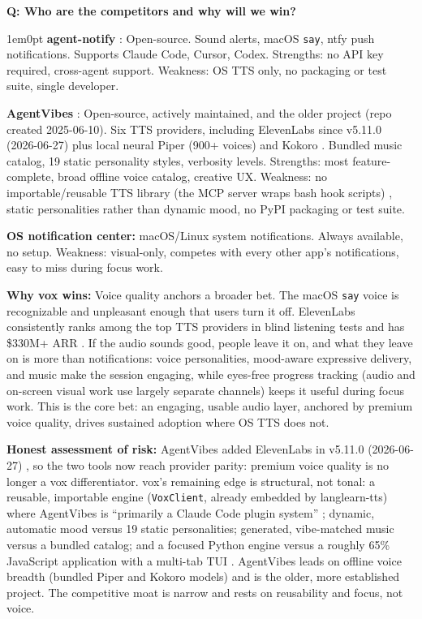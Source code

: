 \documentclass[11pt,letterpaper]{article}
\newcounter{faqnum}
\newenvironment{faqpair}[1]{%
  \needspace{4\baselineskip}%
  \vspace{0.5em}%
  \refstepcounter{faqnum}%
  \noindent\textbf{\color{SectionBlue}Q\thefaqnum: #1}\par\nopagebreak[4]%
  \vspace{0.2em}%
  \begin{adjustwidth}{1em}{0pt}%
  \setlength{\parindent}{0pt}%
}{%
  \end{adjustwidth}%
  \vspace{0.5em}%
}
\begin{document}
\begin{faqpair}{Who are the competitors and why will we win?}\label{faq:competitive}
  \textbf{agent-notify} \cite{agentnotify2025}: Open-source. Sound alerts,
  macOS \texttt{say}, ntfy push notifications. Supports Claude Code, Cursor,
  Codex. Strengths: no API key required, cross-agent support. Weakness: OS
  TTS only, no packaging or test suite, single developer.

  \textbf{AgentVibes} \cite{agentvibes2025}: Open-source, actively maintained,
  and the older project (repo created 2025-06-10). Six TTS providers, including
  ElevenLabs since v5.11.0 (2026-06-27) plus local neural Piper (900+ voices)
  and Kokoro \cite{agentvibes2026releasenotes,agentvibes2026providers}. Bundled
  music catalog, 19 static personality styles, verbosity levels. Strengths: most
  feature-complete, broad offline voice catalog, creative UX. Weakness: no
  importable/reusable TTS library (the MCP server wraps bash hook scripts)
  \cite{agentvibes2026technicaldeepdive}, static personalities rather than
  dynamic mood, no PyPI packaging or test suite.

  \textbf{OS notification center:} macOS/Linux system notifications. Always
  available, no setup. Weakness: visual-only, competes with every other app's
  notifications, easy to miss during focus work.

  \textbf{Why vox wins:} Voice quality anchors a broader bet. The macOS
  \texttt{say} voice is recognizable and unpleasant enough that users turn it
  off. ElevenLabs consistently ranks among the top TTS providers in blind
  listening tests and has \$330M+ ARR \cite{cnbc2026elevenlabs}. If the audio
  sounds good, people leave it on, and what they leave on is more than
  notifications: voice personalities, mood-aware expressive delivery, and
  music make the session engaging, while eyes-free progress tracking (audio
  and on-screen visual work use largely separate channels) keeps it useful
  during focus work. This is the core bet: an engaging, usable audio layer,
  anchored by premium voice quality, drives sustained adoption where OS TTS
  does not.

  \textbf{Honest assessment of risk:} AgentVibes added ElevenLabs in v5.11.0
  (2026-06-27) \cite{agentvibes2026releasenotes}, so the two tools now reach
  provider parity: premium voice quality is no longer a vox differentiator.
  vox's remaining edge is structural, not tonal: a reusable, importable engine
  (\texttt{VoxClient}, already embedded by langlearn-tts) where AgentVibes is
  ``primarily a Claude Code plugin system''
  \cite{agentvibes2026technicaldeepdive}; dynamic, automatic mood versus 19
  static personalities; generated, vibe-matched music versus a bundled catalog;
  and a focused Python engine versus a roughly 65\% JavaScript application with
  a multi-tab TUI \cite{agentvibes2026github}. AgentVibes leads on offline voice
  breadth (bundled Piper and Kokoro models) and is the older, more established
  project. The competitive moat is narrow and rests on reusability and focus,
  not voice.
\end{faqpair}
\end{document}
